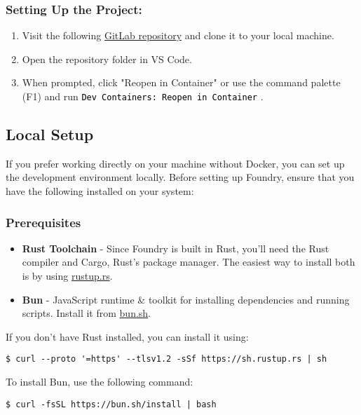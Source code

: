 \documentclass[12pt]{article}
\newcommand{\codegrey}[1]{%
  \texttt{\colorbox{black!4}{\textcolor{black}{#1}}}%
}
\begin{document}
\subsubsection*{Setting Up the Project:}

\begin{enumerate}
  \item Visit the following \href{https://gitlab.fel.cvut.cz/radovluk/smart-contracts-exercises/-/tree/foundry/09-Vulnerabilities-Detection/task/task-code}{GitLab repository} and clone it to your local machine.
  \item Open the repository folder in VS Code.
  \item When prompted, click "Reopen in Container" or use the command palette (F1) and run \codegrey{Dev Containers: Reopen in Container}.
\end{enumerate}

\subsection{Local Setup}

If you prefer working directly on your machine without Docker, you can set up the development environment locally. Before setting up Foundry, ensure that you have the following installed on your system:

\subsubsection*{Prerequisites}
\begin{itemize}
    \item \textbf{Rust Toolchain} - Since Foundry is built in Rust, you'll need the Rust compiler and Cargo, Rust's package manager. The easiest way to install both is by using \href{https://rustup.rs/}{rustup.rs}.
    \item \textbf{Bun} - JavaScript runtime \& toolkit for installing dependencies and running scripts. Install it from \href{https://bun.sh/}{bun.sh}.
\end{itemize}

\noindent
If you don't have Rust installed, you can install it using:

\begin{verbatim}
$ curl --proto '=https' --tlsv1.2 -sSf https://sh.rustup.rs | sh
\end{verbatim}

\noindent
To install Bun, use the following command:
\begin{verbatim}
$ curl -fsSL https://bun.sh/install | bash
\end{verbatim}
\end{document}
